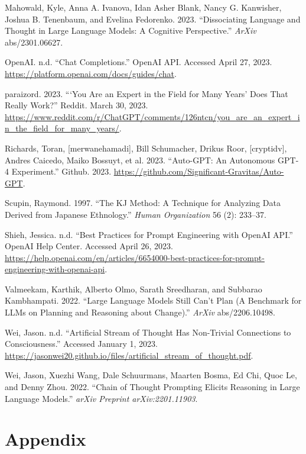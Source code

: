 \documentclass[
]{book}
\newlength{\cslhangindent}
\newlength{\cslentryspacingunit} %
\newenvironment{CSLReferences}[2] %
 {%
  \setlength{\parindent}{0pt}
  \ifodd #1
  \let\oldpar\par
  \def\par{\hangindent=\cslhangindent\oldpar}
  \fi
  \setlength{\parskip}{#2\cslentryspacingunit}
 }%
 {}
\begin{document}
\begin{CSLReferences}{1}{0}
\leavevmode{}%
Mahowald, Kyle, Anna A. Ivanova, Idan Asher Blank, Nancy G. Kanwisher, Joshua B. Tenenbaum, and Evelina Fedorenko. 2023. {``Dissociating Language and Thought in Large Language Models: A Cognitive Perspective.''} \emph{ArXiv} abs/2301.06627.

\leavevmode{}%
OpenAI. n.d. {``Chat Completions.''} OpenAI API. Accessed April 27, 2023. \url{https://platform.openai.com/docs/guides/chat}.

\leavevmode{}%
paraizord. 2023. {``{`You Are an Expert in the Field for Many Years'} Does That Really Work?''} Reddit. March 30, 2023. \url{https://www.reddit.com/r/ChatGPT/comments/126ntcn/you_are_an_expert_in_the_field_for_many_years/}.

\leavevmode{}%
Richards, Toran, {[}merwanehamadi{]}, Bill Schumacher, Drikus Roor, {[}cryptidv{]}, Andres Caicedo, Maiko Bossuyt, et al. 2023. {``Auto-GPT: An Autonomous GPT-4 Experiment.''} Github. 2023. \url{https://github.com/Significant-Gravitas/Auto-GPT}.

\leavevmode{}%
Scupin, Raymond. 1997. {``The KJ Method: A Technique for Analyzing Data Derived from Japanese Ethnology.''} \emph{Human Organization} 56 (2): 233--37.

\leavevmode{}%
Shieh, Jessica. n.d. {``Best Practices for Prompt Engineering with OpenAI API.''} OpenAI Help Center. Accessed April 26, 2023. \url{https://help.openai.com/en/articles/6654000-best-practices-for-prompt-engineering-with-openai-api}.

\leavevmode{}%
Valmeekam, Karthik, Alberto Olmo, Sarath Sreedharan, and Subbarao Kambhampati. 2022. {``Large Language Models Still Can't Plan (A Benchmark for LLMs on Planning and Reasoning about Change).''} \emph{ArXiv} abs/2206.10498.

\leavevmode{}%
Wei, Jason. n.d. {``Artificial Stream of Thought Has Non-Trivial Connections to Consciousness.''} Accessed January 1, 2023. \url{https://jasonwei20.github.io/files/artificial_stream_of_thought.pdf}.

\leavevmode{}%
Wei, Jason, Xuezhi Wang, Dale Schuurmans, Maarten Bosma, Ed Chi, Quoc Le, and Denny Zhou. 2022. {``Chain of Thought Prompting Elicits Reasoning in Large Language Models.''} \emph{arXiv Preprint arXiv:2201.11903}.

\end{CSLReferences}

\hypertarget{appendix}{%
\section{Appendix}\label{appendix}}

\backmatter
\end{document}
